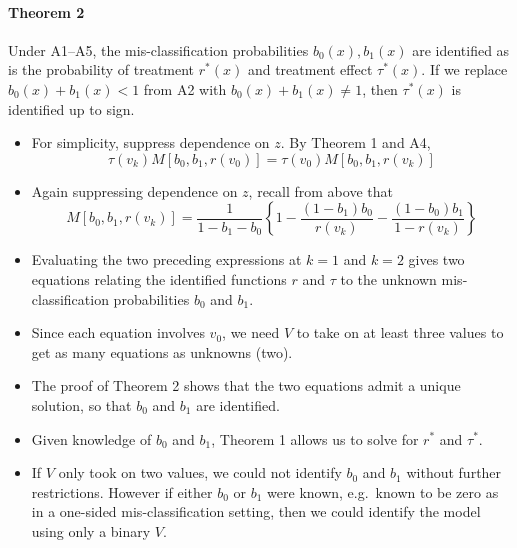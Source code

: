 \documentclass[12pt]{article}
\begin{document}
\paragraph{Theorem 2} Under A1--A5, the mis-classification probabilities $b_0(x),b_1(x)$ are identified as is the probability of treatment $r^*(x)$ and treatment effect $\tau^*(x)$.
If we replace $b_0(x)+b_1(x)<1$ from A2 with $b_0(x)+b_1(x) \neq 1$, then $\tau^*(x)$ is identified up to sign. 
\begin{itemize}
  \item For simplicity, suppress dependence on $z$. By Theorem 1 and A4,
    \[
      \tau(v_k) M\left[ b_0, b_1, r(v_0) \right] = \tau(v_0)M\left[ b_0, b_1, r(v_k) \right]
    \]
  \item Again suppressing dependence on $z$, recall from above that \[M[b_0, b_1, r(v_k)] = \frac{1}{1 - b_1 - b_0}\left\{ 1 - \frac{(1 - b_1)b_0}{r(v_k)} - \frac{(1 - b_0)b_1}{1 - r(v_k)} \right\}\]
  \item Evaluating the two preceding expressions at $k=1$ and $k=2$ gives two equations relating the identified functions $r$ and $\tau$ to the unknown mis-classification probabilities $b_0$ and $b_1$.
  \item Since each equation involves $v_0$, we need $V$ to take on at least three values to get as many equations as unknowns (two).
  \item The proof of Theorem 2 shows that the two equations admit a unique solution, so that $b_0$ and $b_1$ are identified.
\item Given knowledge of $b_0$ and $b_1$, Theorem 1 allows us to solve for $r^*$ and $\tau^*$.
\item If $V$ only took on two values, we could not identify $b_0$ and $b_1$ without further restrictions. However if either $b_0$ or $b_1$ were known, e.g.\ known to be zero as in a one-sided mis-classification setting, then we could identify the model using only a binary $V$.
\end{itemize}
\end{document}
